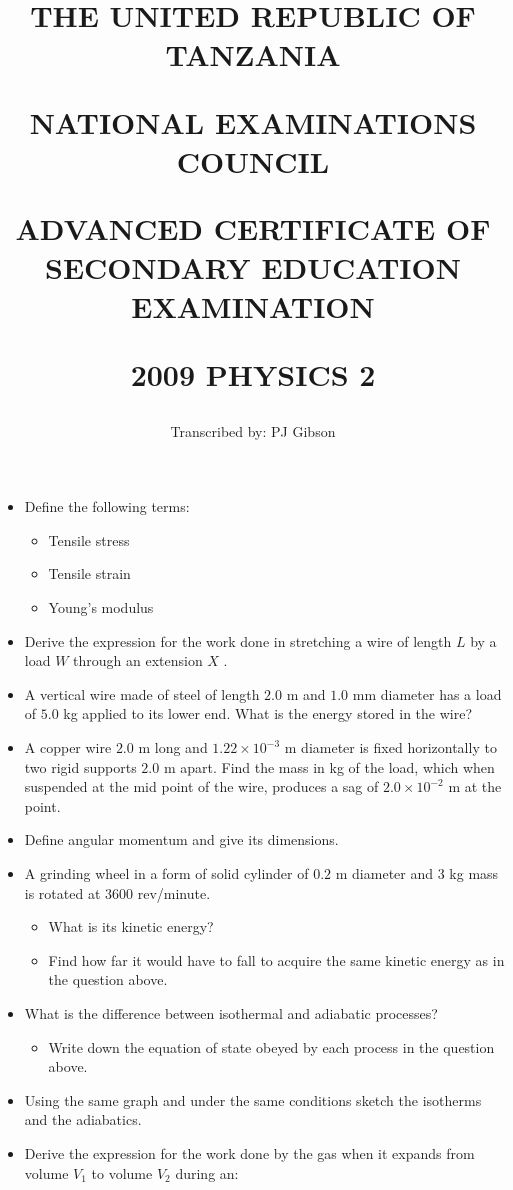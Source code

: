\documentclass{article}
\title{THE UNITED REPUBLIC OF TANZANIA

NATIONAL EXAMINATIONS COUNCIL

ADVANCED CERTIFICATE OF SECONDARY EDUCATION EXAMINATION

\textbf{2009 PHYSICS 2}}
\author{Transcribed by:  PJ Gibson}
\begin{document}
\maketitle

\begin{itemize}
\item Define the following terms:
 \begin{itemize}
\item Tensile stress
\item Tensile strain
\item Young’s modulus
\end{itemize}
\item Derive the expression for the work done in stretching a wire of length $ L$ by a load $ W$ through an extension $ X$ .
\item A vertical wire made of steel of length $ 2.0$ m and $ 1.0$ mm diameter has a load of $ 5.0$ kg applied to its lower end.  What is the energy stored in the wire?
\item A copper wire $ 2.0$ m long and $ 1.22 \times 10^{-3}$ m diameter is fixed horizontally to two rigid supports $ 2.0$ m apart.  Find the mass in kg of the load, which when suspended at the mid point of the wire, produces a sag of $ 2.0 \times 10^{-2}$ m at the point.
\item Define angular momentum and give its dimensions.
\item A grinding wheel in a form of solid cylinder of $ 0.2$ m diameter and $ 3$ kg mass is rotated at $ 3600$ rev/minute.
 \begin{itemize}
\item What is its kinetic energy?
\item Find how far it would have to fall to acquire the same kinetic energy as in the question above.
\end{itemize}
\item What is the difference between isothermal and adiabatic processes?
 \begin{itemize}
\item Write down the equation of state obeyed by each process in the question above.
\end{itemize}
\item Using the same graph and under the same conditions sketch the isotherms and the adiabatics.
\item Derive the expression for the work done by the gas when it expands from volume $ V_{1}$ to volume $ V_{2}$ during an:
 \begin{itemize}

\end{itemize}
\end{itemize}
\end{document}
